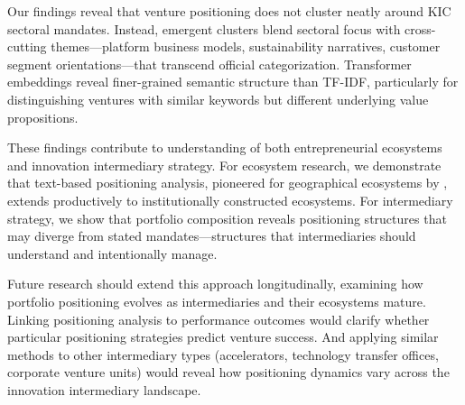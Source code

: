\documentclass[../main.tex]{subfiles}
\begin{document}
Our findings reveal that venture positioning does not cluster neatly around KIC sectoral mandates. Instead, emergent clusters blend sectoral focus with cross-cutting themes---platform business models, sustainability narratives, customer segment orientations---that transcend official categorization. Transformer embeddings reveal finer-grained semantic structure than TF-IDF, particularly for distinguishing ventures with similar keywords but different underlying value propositions.

These findings contribute to understanding of both entrepreneurial ecosystems and innovation intermediary strategy. For ecosystem research, we demonstrate that text-based positioning analysis, pioneered for geographical ecosystems by \cite{basole2019visual}, extends productively to institutionally constructed ecosystems. For intermediary strategy, we show that portfolio composition reveals positioning structures that may diverge from stated mandates---structures that intermediaries should understand and intentionally manage.

Future research should extend this approach longitudinally, examining how portfolio positioning evolves as intermediaries and their ecosystems mature. Linking positioning analysis to performance outcomes would clarify whether particular positioning strategies predict venture success. And applying similar methods to other intermediary types (accelerators, technology transfer offices, corporate venture units) would reveal how positioning dynamics vary across the innovation intermediary landscape.
\end{document}
